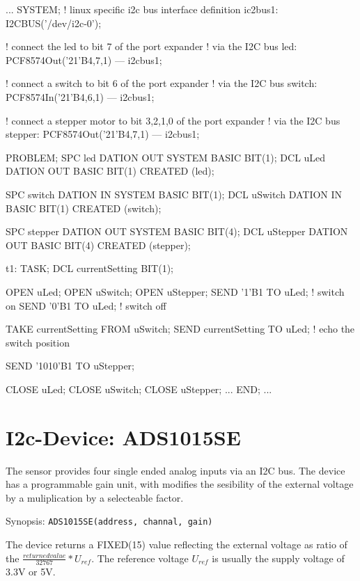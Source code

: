 \begin{PEARLCode}
...
SYSTEM;
   ! linux specific i2c bus interface definition
   ic2bus1: I2CBUS('/dev/i2c-0');

   ! connect the led to bit 7 of the port expander
   ! via the I2C bus
   led: PCF8574Out('21'B4,7,1) --- i2cbus1;

   ! connect a switch to bit 6 of the port expander
   ! via the I2C bus
   switch: PCF8574In('21'B4,6,1) --- i2cbus1;

   ! connect a stepper motor to bit 3,2,1,0 of the port expander
   ! via the I2C bus
   stepper: PCF8574Out('21'B4,7,1) --- i2cbus1;

PROBLEM;
   SPC led DATION OUT SYSTEM BASIC BIT(1);
   DCL uLed DATION OUT BASIC BIT(1) CREATED (led);

   SPC switch DATION IN SYSTEM BASIC BIT(1);
   DCL uSwitch DATION IN BASIC BIT(1) CREATED (switch);

   SPC stepper DATION OUT SYSTEM BASIC BIT(4);
   DCL uStepper DATION OUT BASIC BIT(4) CREATED (stepper);

t1: TASK;
   DCL currentSetting BIT(1);

   OPEN uLed;
   OPEN uSwitch;
   OPEN uStepper;
   SEND '1'B1 TO uLed;  ! switch on
   SEND '0'B1 TO uLed;  ! switch off

   TAKE currentSetting FROM uSwitch;
   SEND currentSetting TO uLed;  ! echo the switch position

   SEND '1010'B1 TO uStepper;
 
   CLOSE uLed;
   CLOSE uSwitch;
   CLOSE uStepper;
...
END;
...
\end{PEARLCode}

\section{I2c-Device: ADS1015SE}
The sensor provides four single ended analog inputs via an I2C bus.
The device  has a programmable gain unit, with modifies the sesibility
of the external voltage by a muliplication by a selecteable factor.

Synopsis: \texttt{ADS1015SE(address, channal, gain)}

The device returns a FIXED(15) value reflecting the external voltage as ratio
of the $\frac{returned value}{32767}*U_{ref}$.
The reference voltage $U_{ref}$ is usually the supply voltage of 3.3V or 5V.

